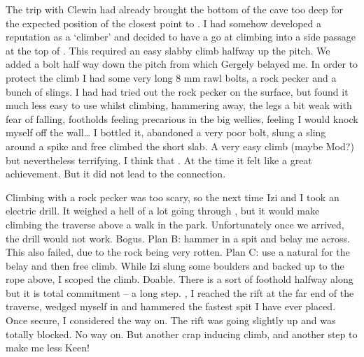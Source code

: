 

The trip with Clewin had already brought the bottom of the cave too deep
for the expected position of the closest point to . I had
somehow developed a reputation as a `climber' and decided to have a go
at climbing into a side passage at the top of . This
required an easy slabby climb halfway up the pitch. We added a bolt half
way down the pitch from which Gergely belayed me. In order to protect
the climb I had some very long 8 mm rawl bolts, a rock pecker and a
bunch of slings. I had had tried out the rock pecker on the surface, but
found it much less easy to use whilst climbing, hammering away, the legs
a bit weak with fear of falling, footholds feeling precarious in the big
wellies, feeling I would knock myself off the wall\ldots{} I bottled it,
abandoned a very poor bolt, slung a sling around a spike and free
climbed the short slab. A very easy climb (maybe Mod?) but nevertheless
terrifying. I think that . At the time it
felt like a great achievement. But it did not lead to the connection.




Climbing with a rock pecker was too scary, so the next time Izi and I
took an electric drill. It weighed a hell of a lot going through
, but it would make climbing the traverse above
 a walk in the park. Unfortunately once we arrived, the
drill would not work. Bogus. Plan B: hammer in a spit and belay me
across. This also failed, due to the rock being very rotten. Plan C: use
a natural for the belay and then free climb. While Izi slung some
boulders and backed up to the rope above, I scoped the climb. Doable.
There is a sort of foothold halfway along but it is total commitment --
a long step. , I reached the rift at the far end of
the traverse, wedged myself in and hammered the fastest spit I have ever
placed. Once secure, I considered the way on. The rift was going
slightly up and was totally blocked. No way on. But another crap
inducing climb, and another step to make me less Keen!

